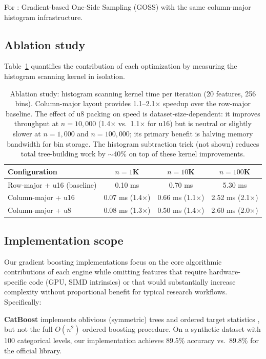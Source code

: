 \documentclass[article]{jss}
\begin{document}
For : Gradient-based One-Side Sampling (GOSS) with the same
column-major histogram infrastructure.

\subsection{Ablation study}

Table~\ref{tab:ablation} quantifies the contribution of each optimization
by measuring the histogram scanning kernel in isolation.

\begin{table}[t!]
\centering
\small
\begin{tabular}{lccc}
\toprule
Configuration & $n = 1$K & $n = 10$K & $n = 100$K \\
\midrule
Row-major + u16 (baseline) & 0.10 ms & 0.70 ms & 5.30 ms \\
Column-major + u16         & 0.07 ms (1.4$\times$) & 0.66 ms (1.1$\times$) & 2.52 ms (2.1$\times$) \\
Column-major + u8          & 0.08 ms (1.3$\times$) & 0.50 ms (1.4$\times$) & 2.60 ms (2.0$\times$) \\
\bottomrule
\end{tabular}
\caption{\label{tab:ablation} Ablation study: histogram scanning kernel time
per iteration (20 features, 256 bins). Column-major layout provides
1.1--2.1$\times$ speedup over the row-major baseline. The effect of u8
packing on speed is dataset-size-dependent: it improves throughput at
$n = 10{,}000$ (1.4$\times$ vs.\ 1.1$\times$ for u16) but is neutral or
slightly slower at $n = 1{,}000$ and $n = 100{,}000$; its primary benefit
is halving memory bandwidth for bin storage. The histogram subtraction
trick (not shown) reduces total tree-building work by $\sim$40\% on top
of these kernel improvements.}
\end{table}

\subsection{Implementation scope} \label{sec:catboost_scope}

Our gradient boosting implementations focus on the core algorithmic
contributions of each engine while omitting features that require
hardware-specific code (GPU, SIMD intrinsics) or that would substantially
increase complexity without proportional benefit for typical research
workflows. Specifically:

{\sloppy
\textbf{CatBoost} implements oblivious (symmetric) trees and ordered target
statistics \citep{Prokhorenkova+Gusev+Vorobev:2018}, but not the full
$O(n^2)$ ordered boosting procedure. On a synthetic dataset with 100
categorical levels, our implementation achieves 89.5\% accuracy vs.\ 89.8\%
for the official library.\par}
\end{document}
